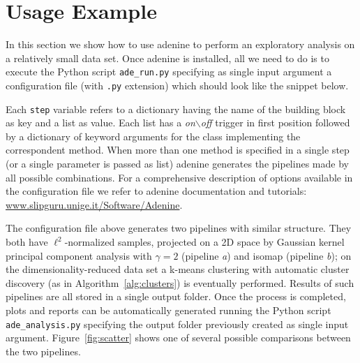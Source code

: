 \documentclass[twoside,11pt]{article}
\makeatletter
\newcommand{\ade}{{\sc adenine}\@\xspace}
\newcommand{\py}{{Python}\@\xspace}
\makeatother
\begin{document}

\section{Usage Example}
In this section we show how to use \ade to perform an exploratory analysis on a relatively small data set. Once \ade is installed, all we need to do is to execute the \py script \texttt{ade\_run.py} specifying as single input argument a configuration file (with \texttt{.py} extension) which should look like the snippet below.



\noindent Each \texttt{step} variable refers to a dictionary having the name of the building block as key and a {list} as value. Each list has a \emph{on$\backslash$off} trigger in first position followed by a dictionary of keyword arguments for the class implementing the correspondent method. When more than one method is specified in a single step (or a single parameter is passed as {list}) \ade generates the pipelines made by all possible combinations.
For a comprehensive description of options available in the configuration file we refer to \ade documentation and tutorials: {\small\url{www.slipguru.unige.it/Software/Adenine}}. %

The configuration file above generates two pipelines with similar structure. They both have $\ell^2$-normalized samples, projected on a 2D space by Gaussian kernel principal component analysis with $\gamma=2$ (pipeline \textit{a}) and isomap (pipeline \textit{b}); on the dimensionality-reduced data set a k-means clustering with automatic cluster discovery (as in Algorithm~\ref{alg:clusters}) is eventually performed.
Results of such pipelines are all stored in a single output folder. Once the process is completed, plots and reports can be automatically generated running the \py script \texttt{ade\_analysis.py} specifying the output folder previously created as single input argument. Figure~\ref{fig:scatter} shows one of several possible comparisons between the two pipelines.
\end{document}
